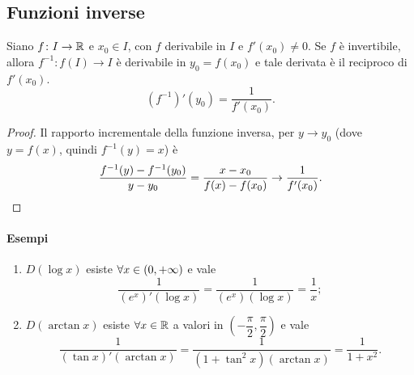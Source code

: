 \subsection{Funzioni inverse}
\begin{teorema}
Siano $f\colon I\to\mathbb{R}$ e $x_0\in I$, con $f$ derivabile in $I$ e $f'(x_0)\neq 0$. Se $f$ è invertibile, allora $f^{-1}\colon f(I)\to I$ è derivabile in $y_0=f(x_0)$ e tale derivata è il reciproco di $f'(x_0)$.
\begin{equation}
(f^{-1})'(y_0)=\frac1{f'(x_0)}.
\end{equation}
\end{teorema}
\begin{proof}
Il rapporto incrementale della funzione inversa, per $y\to y_0$ (dove $y=f(x)$, quindi $f^{-1}(y)=x$) è
\[
\frac{f^{-1}(y)-f^{-1}(y_0)}{y-y_0}=\frac{x-x_0}{f(x)-f(x_0)}\to\frac1{f'(x_0)}.\qedhere
\]
\end{proof}
\paragraph{Esempi}
\begin{enumerate}
\item $D(\log x)$ esiste $\forall x\in (0,+\infty)$ e vale
\[
\frac1{(e^x)'(\log x)}=\frac1{(e^x)(\log x)}=\frac1{x};
\]
\item $D(\arctan x)$ esiste $\forall x\in\mathbb{R}$ a valori in $\left(-\dfrac{\pi}2,\dfrac{\pi}2\right)$ e vale
\[
\frac1{(\tan x)'(\arctan x)}=\frac1{(1+\tan^2x)(\arctan x)}=\frac1{1+x^2}.
\]
\end{enumerate}
